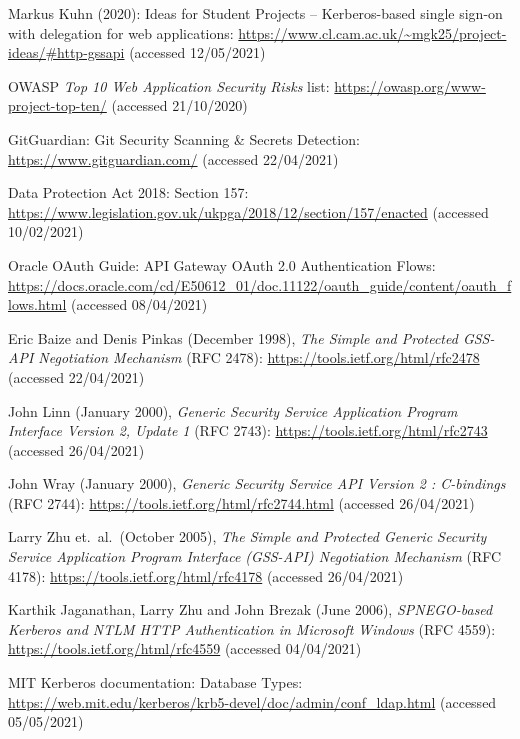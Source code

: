 \documentclass[12pt]{report}
\begin{document}
\begin{thebibliography}{99}
 Markus Kuhn (2020): Ideas for Student Projects -- Kerberos-based single sign-on with delegation for web applications: \url{https://www.cl.cam.ac.uk/~mgk25/project-ideas/#http-gssapi} (accessed 12/05/2021)

 OWASP \textit{Top 10 Web Application Security Risks} list: \url{https://owasp.org/www-project-top-ten/} (accessed 21/10/2020)

 GitGuardian: Git Security Scanning \& Secrets Detection: \url{https://www.gitguardian.com/} (accessed 22/04/2021)

 Data Protection Act 2018: Section 157: \url{https://www.legislation.gov.uk/ukpga/2018/12/section/157/enacted} (accessed 10/02/2021)

 Oracle OAuth Guide: API Gateway OAuth 2.0 Authentication Flows: \url{https://docs.oracle.com/cd/E50612_01/doc.11122/oauth_guide/content/oauth_flows.html} (accessed 08/04/2021)

 Eric Baize and Denis Pinkas (December 1998), \textit{The Simple and Protected GSS-API Negotiation Mechanism} (RFC 2478): \url{https://tools.ietf.org/html/rfc2478} (accessed 22/04/2021)

 John Linn (January 2000), \textit{Generic Security Service Application Program Interface Version 2, Update 1} (RFC 2743): \url{https://tools.ietf.org/html/rfc2743} (accessed 26/04/2021)

 John Wray (January 2000), \textit{Generic Security Service API Version 2 : C-bindings} (RFC 2744): \url{https://tools.ietf.org/html/rfc2744.html} (accessed 26/04/2021)

 Larry Zhu et.\ al.\ (October 2005), \textit{The Simple and Protected Generic Security Service Application Program Interface (GSS-API) Negotiation Mechanism} (RFC 4178): \url{https://tools.ietf.org/html/rfc4178} (accessed 26/04/2021)

 Karthik Jaganathan, Larry Zhu and John Brezak (June 2006), \textit{SPNEGO-based Kerberos and NTLM HTTP Authentication in Microsoft Windows} (RFC 4559): \url{https://tools.ietf.org/html/rfc4559} (accessed 04/04/2021)

 MIT Kerberos documentation: Database Types: \url{https://web.mit.edu/kerberos/krb5-devel/doc/admin/conf_ldap.html} (accessed 05/05/2021)


\end{thebibliography}
\end{document}
